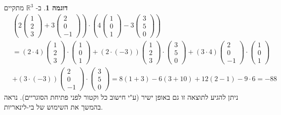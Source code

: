 \documentclass[12pt]{report}
\theoremstyle{plain}
\theoremstyle{definition}
\newtheorem{example}{דוגמה}[chapter]
\newcommand{\R}{\mathbb{R}}
\newcommand{\0}{\mathbf{0}}
\begin{document}
\begin{example}
ב-
$\R^3$
מתקיים
$$
\begin{aligned}
&\left(2\begin{pmatrix}
1 \\
2 \\
3
\end{pmatrix}+3\begin{pmatrix}
2 \\
0 \\
-1
\end{pmatrix}\right)\cdot\left(4\begin{pmatrix}
1 \\
0 \\
1
\end{pmatrix}-3\begin{pmatrix}
3 \\
5 \\
0
\end{pmatrix}\right) \\
&=(2\cdot 4)\begin{pmatrix}
1 \\
2 \\
3
\end{pmatrix}\cdot\begin{pmatrix}
1 \\
0 \\
1
\end{pmatrix}+(2\cdot(-3))\begin{pmatrix}
1 \\
2 \\
3
\end{pmatrix}\cdot\begin{pmatrix}
3 \\
5 \\
0
\end{pmatrix}+(3\cdot 4)\begin{pmatrix}
2 \\
0 \\
-1
\end{pmatrix}\cdot\begin{pmatrix}
1 \\
0 \\
1
\end{pmatrix} \\
&+(3\cdot(-3))\begin{pmatrix}
2 \\
0 \\
-1
\end{pmatrix}\cdot\begin{pmatrix}
3 \\
5 \\
0
\end{pmatrix}=8(1+3)-6(3+10)+12(2-1)-9\cdot 6=-88
\end{aligned}
$$
ניתן להגיע לתוצאה זו גם באופן ישיר (ע"י חישוב כל וקטור לפני פתיחת הסוגריים). נראה בהמשך את השימוש של בי-לינאריות.
\end{example}
\end{document}
